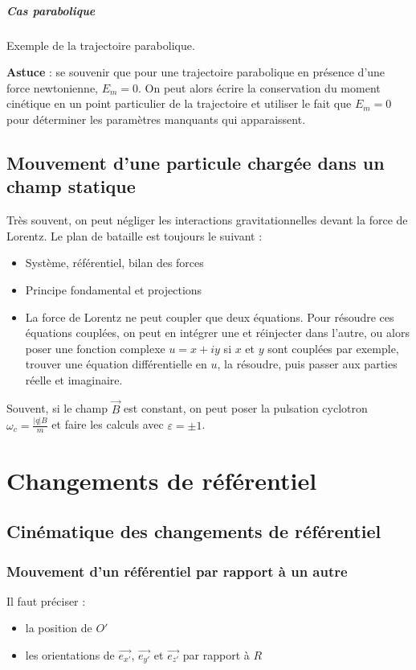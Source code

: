 \documentclass[french]{book}
\theoremstyle{plain}
\theoremstyle{definition}
\theoremstyle{remark}
\begin{document}
\paragraph{Cas parabolique} Exemple de la trajectoire parabolique. \\ \par \textbf{Astuce} : se souvenir que pour une trajectoire parabolique en présence d'une force newtonienne, $E_m=0$. On peut alors écrire la conservation du moment cinétique en un point particulier de la trajectoire et utiliser le fait que $E_m=0$ pour déterminer les paramètres manquants qui apparaissent.
\section{Mouvement d'une particule chargée dans un champ statique}
Très souvent, on peut négliger les interactions gravitationnelles devant la force de Lorentz. Le plan de bataille est toujours le suivant : \begin{itemize}
	\item Système, référentiel, bilan des forces
	\item Principe fondamental et projections
	\item La force de Lorentz ne peut coupler que deux équations. Pour résoudre ces équations couplées, on peut en intégrer une et réinjecter dans l'autre, ou alors poser une fonction complexe $u=x+iy$ si $x$ et $y$ sont couplées par exemple, trouver une équation différentielle en $u$, la résoudre, puis passer aux parties réelle et imaginaire.
\end{itemize}
Souvent, si le champ $\overrightarrow{B}$ est constant, on peut poser la pulsation cyclotron $\omega_c=\displaystyle\frac{\lvert q\rvert B}{m}$ et faire les calculs avec $\varepsilon=\pm 1$.

\chapter{Changements de référentiel}
\localtableofcontents
\section{Cinématique des changements de référentiel}
\subsection{Mouvement d'un référentiel par rapport à un autre}
Il faut préciser : 
\begin{itemize}
	\item la position de $O'$
	\item les orientations de $\overrightarrow{e_{x'}}$, $\overrightarrow{e_{y'}}$ et $\overrightarrow{e_{z'}}$ par rapport à $R$
\end{itemize}
\end{document}

